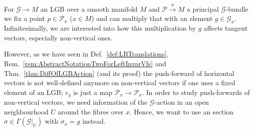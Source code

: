 \documentclass[a4paper,oneside,11pt,bibliography=totoc]{scrartcl}
\theoremstyle{plain}
\theoremstyle{remark}
\theoremstyle{definition}
\begin{document}
\begin{center}
\end{center}

For $\mathcal{G} \to M$ an LGB over a smooth manifold $M$ and $\mathcal{P} \stackrel{\pi}{\to} M$ a principal $\mathcal{G}$-bundle we fix a point $p \in \mathcal{P}_x$ ($x \in M$) and can multiply that with an element $g \in \mathcal{G}_x$. Infinitesimally, we are interested into how this multiplication by $g$ affects tangent vectors, especially non-vertical ones.

However, as we have seen in Def.\ \ref{def:LRTranslations}, Rem.\ \ref{rem:AbstractNotationTwoForLeftInvarVfs} and Thm.\ \ref{thm:DiffOfLGBAction} (and its proof) the push-forward of horizontal vectors is not well-defined anymore on non-vertical vectors if one uses a fixed element of an LGB; $r_g$ is just a map $\mathcal{P}_x \to \mathcal{P}_x$. In order to study push-forwards of non-vertical vectors, we need information of the $\mathcal{G}$-action in an open neighbourhood $U$ around the fibres over $x$. Hence, we want to use an section $\sigma \in \Gamma(\mathcal{G}|_U)$ with $\sigma_x= g$ instead.
\end{document}
